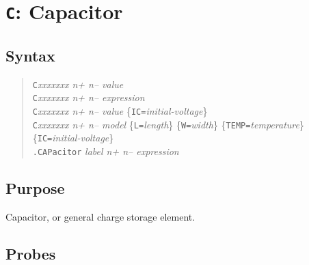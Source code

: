 %
%
%
%
\section{{\tt C}: Capacitor}
\subsection{Syntax}
\begin{verse}
  {\tt C}{\it xxxxxxx n+ n-- value}\\
  {\tt C}{\it xxxxxxx n+ n-- expression}\\
  {\tt C}{\it xxxxxxx n+ n-- value} 
        \{{\tt IC=}{\it initial-voltage}\}\\
  {\tt C}{\it xxxxxxx n+ n-- model} \{{\tt L=}{\it length}\}
        \{{\tt W=}{\it width}\} \{{\tt TEMP=}{\it temperature}\}
        \{{\tt IC=}{\it initial-voltage}\}\\
  {\tt .CAPacitor} {\it label n+ n-- expression}
\end{verse}
\subsection{Purpose}

Capacitor, or general charge storage element.
\subsection{Probes}

